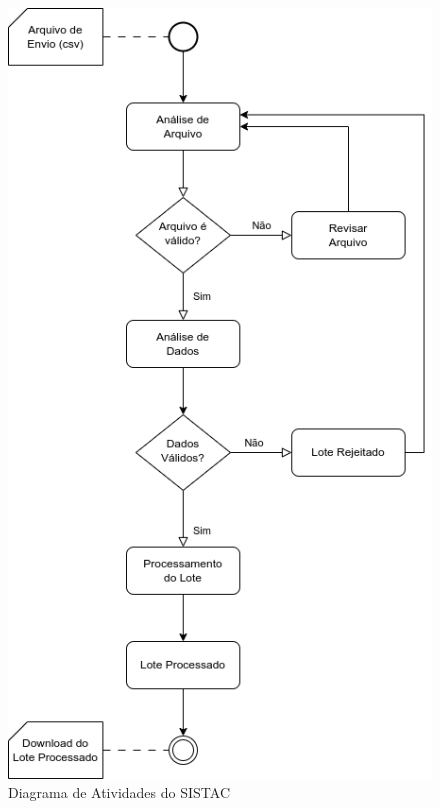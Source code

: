 \documentclass[
	12pt,			%
	openright,		%
	oneside,	
	a4paper,		%
	english,		%
	brazil			%
]{abntex2/abntex2}  %
\begin{document}
		\clearpage
		\begin{figure}[ht]
			\begin{center}
				
				\caption{Diagrama de Atividades do SISTAC}
				\includegraphics[scale=0.75]{img/diagrama-ativs-sistac}
				
			\end{center}
		\end{figure}
		
\end{document}
